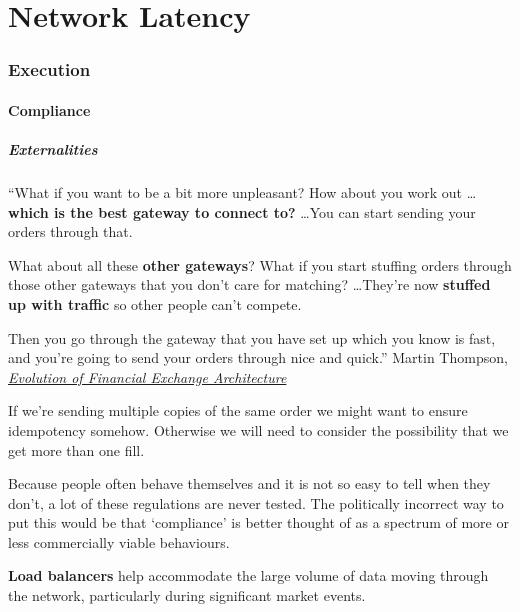 \documentclass{article}
\newif\ifhasdiagram
\newcommand{\sectiondiagram}[1]{%
    \def\insertsdiagram{#1}%
    \hasdiagramtrue
}
\newcommand{\sectionquote}[1]{%
    \def\insertsquote{\small #1}%
}
\newcommand{\insertsdiagram}{}
\newcommand{\insertsquote}{}
\renewcommand{\insertsquote}{}%
\begin{document}
\part{Network Latency}

\sectiondiagram{execution}
\sectionquote{``We affirm that the world's magnificence has been enriched by a new beauty: \\the beauty of speed.'' Filippo Marinetti}
\section{Execution}

\subsection{Compliance}
\subsubsection{Externalities}
\begin{block}{}
	``What if you want to be a bit more unpleasant? How about you work out \ldots \textbf{which is the best gateway to connect to?} \ldots You can start sending your orders through that.

	What about all these \textbf{other gateways}? What if you start stuffing orders through those other gateways that you don't care for matching? \ldots They're now \textbf{stuffed up with traffic} so other people can't compete.

	Then you go through the gateway that you have set up which you know is fast, and you're going to send your orders through nice and quick.'' Martin Thompson, \href{https://www.infoq.com/presentations/financial-exchange-architecture/}{\textit{Evolution of Financial Exchange Architecture}}
\end{block}

If we're sending multiple copies of the same order we might want to ensure idempotency somehow. Otherwise we will need to consider the possibility that we get more than one fill.

Because people often behave themselves and it is not so easy to tell when they don't, a lot of these regulations are never tested. The politically incorrect way to put this would be that `compliance' is better thought of as a spectrum of more or less commercially viable behaviours.

\textbf{Load balancers} help accommodate the large volume of data moving through the network, particularly during significant market events.
\end{document}

